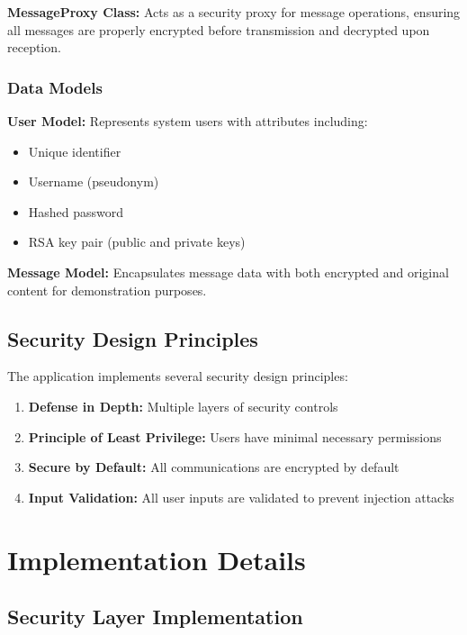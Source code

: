\documentclass[12pt,a4paper]{article}
\begin{document}
\textbf{MessageProxy Class:}
Acts as a security proxy for message operations, ensuring all messages are properly encrypted before transmission and decrypted upon reception.

\subsubsection{Data Models}

\textbf{User Model:}
Represents system users with attributes including:
\begin{itemize}
    \item Unique identifier
    \item Username (pseudonym)
    \item Hashed password
    \item RSA key pair (public and private keys)
\end{itemize}

\textbf{Message Model:}
Encapsulates message data with both encrypted and original content for demonstration purposes.

\subsection{Security Design Principles}

The application implements several security design principles:

\begin{enumerate}
    \item \textbf{Defense in Depth:} Multiple layers of security controls
    \item \textbf{Principle of Least Privilege:} Users have minimal necessary permissions
    \item \textbf{Secure by Default:} All communications are encrypted by default
    \item \textbf{Input Validation:} All user inputs are validated to prevent injection attacks
\end{enumerate}

\section{Implementation Details}

\subsection{Security Layer Implementation}
\end{document}
